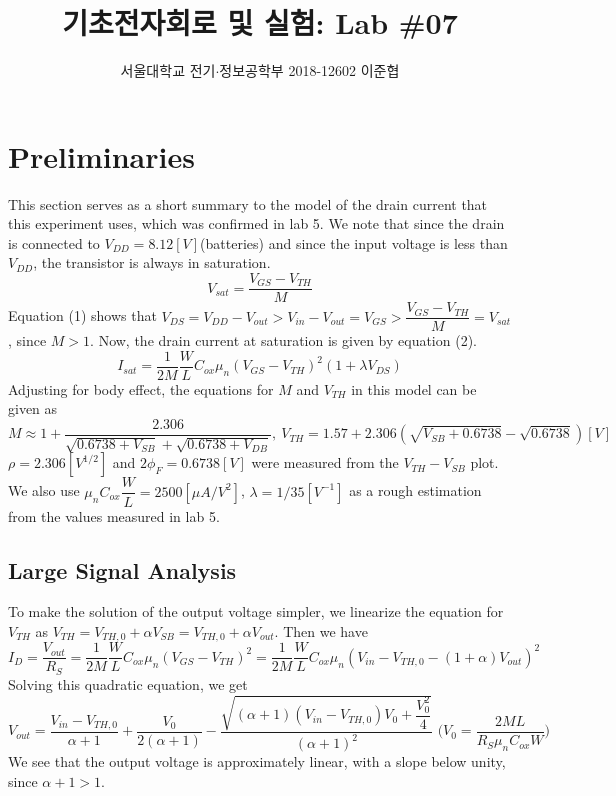 \documentclass[a4paper, itemph]{oblivoir}
\theoremstyle{definition}
\begin{document}
\title{기초전자회로 및 실험: Lab \#07}
\author{서울대학교 전기$\cdot$정보공학부 2018-12602 이준협}
\maketitle

\section{Preliminaries}
This section serves as a short summary to the model of the drain current that this experiment uses, which was confirmed in lab 5. We note that since the drain is connected to $V_{DD}=8.12[V]$(batteries) and since the input voltage is less than $V_{DD}$, the transistor is always in saturation. 
\begin{equation}
     V_{sat}=\dfrac{V_{GS}-V_{TH}}{M}
\end{equation}
Equation (1) shows that $V_{DS}=V_{DD}-V_{out}>V_{in}-V_{out}=V_{GS}>\dfrac{V_{GS}-V_{TH}}{M}=V_{sat}$, since $M>1$. Now, the drain current at saturation is given by equation (2).
\begin{equation}
    I_{sat} = \dfrac{1}{2M}\dfrac{W}{L}C_{ox}\mu_n(V_{GS}-V_{TH})^2(1+\lambda V_{DS})
\end{equation}
Adjusting for body effect, the equations for $M$ and $V_{TH}$ in this model can be given as
\[M\approx 1+\dfrac{2.306}{\sqrt{0.6738+V_{SB}}+\sqrt{0.6738+V_{DB}}},\:V_{TH}=1.57+2.306(\sqrt{V_{SB}+0.6738}-\sqrt{0.6738})[V]\]
$\rho=2.306[V^{1/2}]$ and $2\phi_F=0.6738[V]$ were measured from the $V_{TH}-V_{SB}$ plot. We also use $\mu_n C_{ox}\dfrac{W}{L}=2500[\mu A/V^2]$, $\lambda = 1/35[V^{-1}]$ as a rough estimation from the values measured in lab 5.
\subsection{Large Signal Analysis}
To make the solution of the output voltage simpler, we linearize the equation for $V_{TH}$ as $V_{TH}=V_{TH,0}+\alpha V_{SB}=V_{TH,0}+\alpha V_{out}$. Then we have
\[
I_D=\frac{V_{out}}{R_S}=\dfrac{1}{2M}\dfrac{W}{L}C_{ox}\mu_n(V_{GS}-V_{TH})^2=\dfrac{1}{2M}\dfrac{W}{L}C_{ox}\mu_n(V_{in}-V_{TH,0}-(1+\alpha)V_{out})^2
\]
Solving this quadratic equation, we get
\begin{equation}
V_{out}=\dfrac{V_{in}-V_{TH,0}}{\alpha+1}+\dfrac{V_0}{2(\alpha+1)}-\dfrac{\sqrt{(\alpha+1)(V_{in}-V_{TH,0})V_0+\dfrac{V_0^2}{4}}}{(\alpha+1)^2}\text{ (}V_0=\dfrac{2ML}{R_S\mu_n C_{ox}W})
\end{equation}
We see that the output voltage is approximately linear, with a slope below unity, since $\alpha+1>1$.
\end{document}

